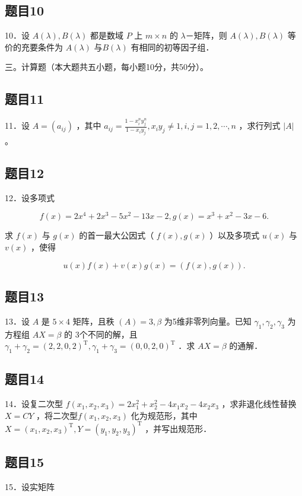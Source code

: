 \documentclass{article}
\begin{document}
\subsection{题目10}
10．设 \(A(\lambda), B(\lambda)\) 都是数域 \(P\) 上 \(m \times n\) 的 \(\lambda\)－矩阵，则 \(A(\lambda), B(\lambda)\) 等价的充要条件为 \(A(\lambda)\) 与\(B(\lambda)\) 有相同的初等因子组．

三。计算题（本大题共五小题，每小题10分，共50分）。\\

\subsection{题目11}
11．设 \(A=\left(a_{i j}\right)\) ，其中 \(a_{i j}=\frac{1-x_{i}^{n} y_{j}^{n}}{1-x_{i} y_{j}}, x_{i} y_{j} \neq 1, i, j=1,2, \cdots, n\) ，求行列式 \(|A|\) 。

\subsection{题目12}
12．设多项式

\[
f(x)=2 x^{4}+2 x^{3}-5 x^{2}-13 x-2, g(x)=x^{3}+x^{2}-3 x-6 .
\]

求 \(f(x)\) 与 \(g(x)\) 的首一最大公因式（ \(f(x), g(x)\) ）以及多项式 \(u(x)\) 与 \(v(x)\) ，使得

\[
u(x) f(x)+v(x) g(x)=(f(x), g(x)) .
\]

\subsection{题目13}
13．设 \(A\) 是 \(5 \times 4\) 矩阵，且秩 \((A)=3, \beta\) 为5维非零列向量。已知 \(\gamma_{1}, \gamma_{2}, \gamma_{3}\) 为方程组 \(A X=\beta\) 的 3个不同的解，且 \(\gamma_{1}+\gamma_{2}=(2,2,0,2)^{\mathrm{T}}, \gamma_{1}+\gamma_{3}=(0,0,2,0)^{\mathrm{T}}\) ．求 \(A X=\beta\) 的通解．

\subsection{题目14}
14．设复二次型 \(f\left(x_{1}, x_{2}, x_{3}\right)=2 x_{1}^{2}+x_{2}^{2}-4 x_{1} x_{2}-4 x_{2} x_{3}\) ，求非退化线性替换 \(X=C Y\) ，将二次型\(f\left(x_{1}, x_{2}, x_{3}\right)\) 化为规范形，其中 \(X=\left(x_{1}, x_{2}, x_{3}\right)^{\mathrm{T}}, Y=\left(y_{1}, y_{2}, y_{3}\right)^{\mathrm{T}}\) ，并写出规范形．

\subsection{题目15}
15．设实矩阵
\end{document}
